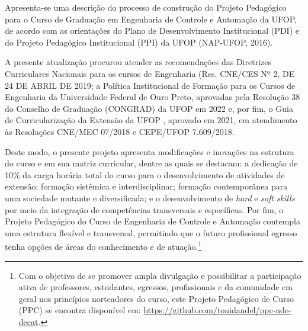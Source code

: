 \documentclass[
	12pt,				%
	openright,			%
	oneside,			%
	a4paper,			%
	english,			%
	brazil				%
	]{abntex2}
\begin{document}
Apresenta-se uma descrição do processo de construção do Projeto  Pedagógico para o Curso de Graduação em Engenharia de Controle e Automação da  UFOP, de acordo com as orientações do Plano de Desenvolvimento Institucional (PDI) e  do Projeto Pedagógico Institucional (PPI) da UFOP (NAP-UFOP, 2016).

A presente atualização procurou atender as recomendações das Diretrizes Curriculares Nacionais para os cursos de Engenharia (Res. CNE/CES Nº 2, DE 24 DE ABRIL DE 2019; a Política Institucional de Formação para os Cursos de Engenharia da Universidade Federal de Ouro Preto, aprovadas  pela Resolução 38 do Conselho de Graduação (CONGRAD) da UFOP em 2022 e, por fim, o Guia de Curricularização da Extensão da UFOP , aprovado em 2021, em atendimento às  Resoluções CNE/MEC 07/2018 e CEPE/UFOP 7.609/2018.

Deste modo, o presente projeto apresenta modificações e inovações na estrutura do curso e em sua matriz curricular, dentre as quais se destacam: a dedicação de 10\% da  carga  horária total do curso para o desenvolvimento de atividades de extensão; formação sistêmica e interdisciplinar; formação  contemporânea para uma sociedade mutante e diversificada; e o desenvolvimento de \textit{hard} e \textit{soft skills} por meio da integração de competências transversais e específicas. Por fim, o Projeto Pedagógico do Curso de Engenharia de Controle e Automação contempla uma estrutura flexível e transversal, permitindo que o futuro profissional egresso tenha opções de áreas do conhecimento e de atuação.\footnote{Com o objetivo de se promover ampla divulgação e possibilitar a participação ativa de  professores, estudantes, egressos, profissionais e da comunidade em geral nos princípios  norteadores do curso, este Projeto Pedagógico de Curso (PPC) se encontra disponível em: \url{https://github.com/tonidandel/ppc-nde-decat}.}

\end{document}
